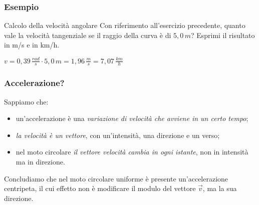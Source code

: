 \documentclass[]{beamer}
\theoremstyle{plain}
\begin{document}
\begin{frame}
  \frametitle{Esempio}
  \begin{exampleblock}{Calcolo della velocità angolare}
    \small{Con riferimento all'esercizio precedente, quanto vale la velocità tangenziale se il raggio della curva è di $ 5,0 \, m $? Esprimi il risultato in m/s e in km/h.}
  \end{exampleblock}\pause

  \begin{center}
    $ v =  0,39 \,\frac{rad}{s} \cdot 5,0 \, m = 1,96 \, \frac{m}{s} = 7,07 \, \frac{km}{h} $
  \end{center} 
\end{frame}


\begin{frame}
  \frametitle{Accelerazione?}
  Sappiamo che:
  \begin{itemize}
    \item un'accelerazione è una \emph<1>{variazione di velocità che avviene in un certo tempo};\pause
    \item \emph<2>{la velocità  è un vettore}, con un'intensità, una direzione e un verso;\pause
    \item nel moto circolare \emph<3>{il vettore velocità cambia in ogni istante}, non in intensità ma in direzione.\pause
  \end{itemize}
  Concludiamo che \alert{nel moto circolare uniforme è presente un'accelerazione centripeta}, il cui effetto non è modificare il modulo del vettore $ \vec{v} $, ma la sua \alert{direzione}.
\end{frame}
\end{document}
